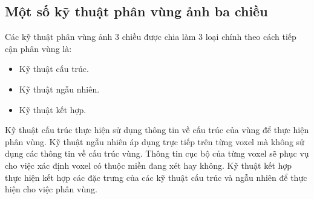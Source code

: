 \documentclass[12pt, oneside, a4paper]{book}
\begin{document}
\subsection{Một số kỹ thuật phân vùng ảnh ba chiều}
Các kỹ thuật phân vùng ảnh 3 chiều được chia làm 3 loại chính theo cách tiếp cận phân vùng là:
\begin{itemize}
\item Kỹ thuật cấu trúc.
\item Kỹ thuật ngẫu nhiên.
\item Kỹ thuật kết hợp.
\end{itemize}
Kỹ thuật cấu trúc thực hiện sử dụng thông tin về cấu trúc của vùng để thực hiện phân vùng. Kỹ thuật ngẫu nhiên áp dụng trực tiếp trên từng voxel mà không sử dụng các thông tin về cấu trúc vùng. Thông tin cục bộ của từng voxel sẽ phục vụ cho việc xác định voxel có thuộc miền đang xét hay không. Kỹ thuật kết hợp thực hiện kết hợp các đặc trưng của các kỹ thuật cấu trúc và ngẫu nhiên để thực hiện cho việc phân vùng.
\end{document}

